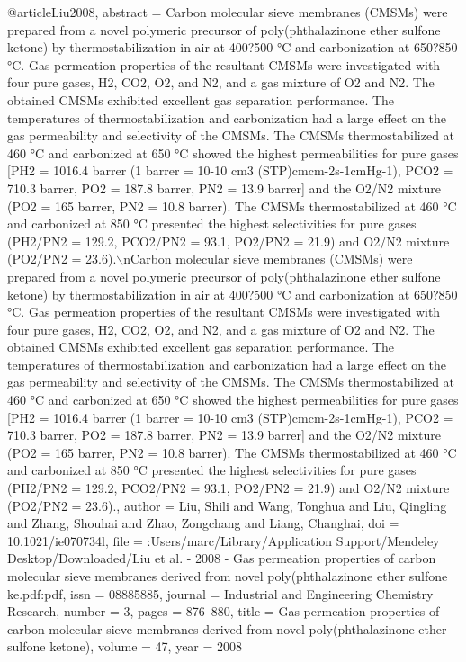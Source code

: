 @article{Liu2008,
abstract = {Carbon molecular sieve membranes (CMSMs) were prepared from a novel polymeric precursor of poly(phthalazinone ether sulfone ketone) by thermostabilization in air at 400?500 °C and carbonization at 650?850 °C. Gas permeation properties of the resultant CMSMs were investigated with four pure gases, H2, CO2, O2, and N2, and a gas mixture of O2 and N2. The obtained CMSMs exhibited excellent gas separation performance. The temperatures of thermostabilization and carbonization had a large effect on the gas permeability and selectivity of the CMSMs. The CMSMs thermostabilized at 460 °C and carbonized at 650 °C showed the highest permeabilities for pure gases [PH2 = 1016.4 barrer (1 barrer = 10-10 cm3 (STP){\textperiodcentered}cm{\textperiodcentered}cm-2{\textperiodcentered}s-1{\textperiodcentered}cmHg-1), PCO2 = 710.3 barrer, PO2 = 187.8 barrer, PN2 = 13.9 barrer] and the O2/N2 mixture (PO2 = 165 barrer, PN2 = 10.8 barrer). The CMSMs thermostabilized at 460 °C and carbonized at 850 °C presented the highest selectivities for pure gases (PH2/PN2 = 129.2, PCO2/PN2 = 93.1, PO2/PN2 = 21.9) and O2/N2 mixture (PO2/PN2 = 23.6).$\backslash$nCarbon molecular sieve membranes (CMSMs) were prepared from a novel polymeric precursor of poly(phthalazinone ether sulfone ketone) by thermostabilization in air at 400?500 °C and carbonization at 650?850 °C. Gas permeation properties of the resultant CMSMs were investigated with four pure gases, H2, CO2, O2, and N2, and a gas mixture of O2 and N2. The obtained CMSMs exhibited excellent gas separation performance. The temperatures of thermostabilization and carbonization had a large effect on the gas permeability and selectivity of the CMSMs. The CMSMs thermostabilized at 460 °C and carbonized at 650 °C showed the highest permeabilities for pure gases [PH2 = 1016.4 barrer (1 barrer = 10-10 cm3 (STP){\textperiodcentered}cm{\textperiodcentered}cm-2{\textperiodcentered}s-1{\textperiodcentered}cmHg-1), PCO2 = 710.3 barrer, PO2 = 187.8 barrer, PN2 = 13.9 barrer] and the O2/N2 mixture (PO2 = 165 barrer, PN2 = 10.8 barrer). The CMSMs thermostabilized at 460 °C and carbonized at 850 °C presented the highest selectivities for pure gases (PH2/PN2 = 129.2, PCO2/PN2 = 93.1, PO2/PN2 = 21.9) and O2/N2 mixture (PO2/PN2 = 23.6).},
author = {Liu, Shili and Wang, Tonghua and Liu, Qingling and Zhang, Shouhai and Zhao, Zongchang and Liang, Changhai},
doi = {10.1021/ie070734l},
file = {:Users/marc/Library/Application Support/Mendeley Desktop/Downloaded/Liu et al. - 2008 - Gas permeation properties of carbon molecular sieve membranes derived from novel poly(phthalazinone ether sulfone ke.pdf:pdf},
issn = {08885885},
journal = {Industrial and Engineering Chemistry Research},
number = {3},
pages = {876--880},
title = {{Gas permeation properties of carbon molecular sieve membranes derived from novel poly(phthalazinone ether sulfone ketone)}},
volume = {47},
year = {2008}
}
